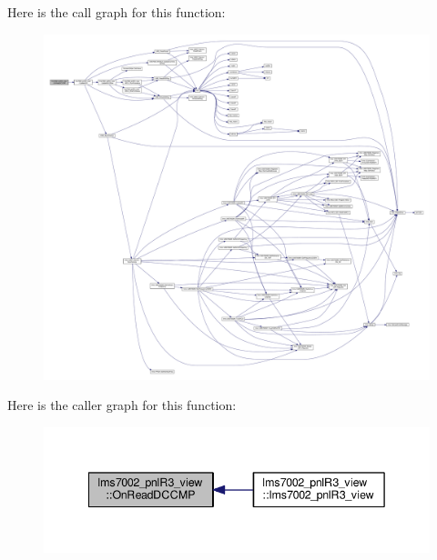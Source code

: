 Here is the call graph for this function\+:
\nopagebreak
\begin{figure}[H]
\begin{center}
\leavevmode
\includegraphics[width=350pt]{d5/d55/classlms7002__pnlR3__view_a538ae670f5a9f2dbcedf330e0ddece19_cgraph}
\end{center}
\end{figure}




Here is the caller graph for this function\+:
\nopagebreak
\begin{figure}[H]
\begin{center}
\leavevmode
\includegraphics[width=342pt]{d5/d55/classlms7002__pnlR3__view_a538ae670f5a9f2dbcedf330e0ddece19_icgraph}
\end{center}
\end{figure}


